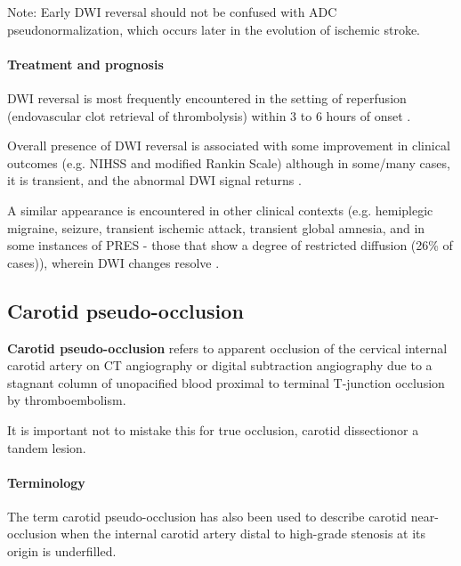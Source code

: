 Note: Early DWI reversal should not be confused with ADC pseudonormalization, which occurs later in the evolution of ischemic stroke.

\paragraph{Treatment and prognosis}

DWI reversal is most frequently encountered in the setting of reperfusion (endovascular clot retrieval of thrombolysis) within 3 to 6 hours of onset .

Overall presence of DWI reversal is associated with some improvement in clinical outcomes (e.g. NIHSS and modified Rankin Scale)  although in some/many cases, it is transient, and the abnormal DWI signal returns .

\begin{tcolorbox}[colback=green!5!white,colframe=green!75!black,title=Differential diagnosis]
	A similar appearance is encountered in other clinical contexts (e.g. hemiplegic migraine, seizure, transient ischemic attack, transient global amnesia, and in some instances of PRES - those that show a degree of restricted diffusion (26\% of cases)), wherein DWI changes resolve .
\end{tcolorbox}
	
\subsection{Carotid pseudo-occlusion}

\textbf{Carotid pseudo-occlusion} refers to apparent occlusion of the cervical internal carotid artery on CT angiography or digital subtraction angiography due to a stagnant column of unopacified blood proximal to terminal T-junction occlusion by thromboembolism.

It is important not to mistake this for true occlusion, carotid dissectionor a tandem lesion.

\paragraph{Terminology}

The term carotid pseudo-occlusion has also been used to describe carotid near-occlusion when the internal carotid artery distal to high-grade stenosis at its origin is underfilled.